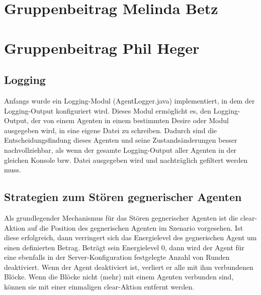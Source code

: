 \documentclass[runningheads]{llncs}
\begin{document}
\section{Gruppenbeitrag Melinda Betz}

\section{Gruppenbeitrag Phil Heger}

\subsection{Logging}
Anfangs wurde ein Logging-Modul (AgentLogger.java) implementiert, in dem der Logging-Output konfiguriert wird. Dieses Modul ermöglicht es, den Logging-Output, der von einem Agenten in einem bestimmten Desire oder Modul ausgegeben wird, in eine eigene Datei zu schreiben. Dadurch sind die Entscheidungsfindung dieses Agenten und seine Zustandsänderungen besser nachvollziehbar, als wenn der gesamte Logging-Output aller Agenten in der gleichen Konsole bzw. Datei ausgegeben wird und nachträglich gefiltert werden muss. 

\subsection{Strategien zum Stören gegnerischer Agenten}
Als grundlegender Mechanismus für das Stören gegnerischer Agenten ist die clear-Aktion auf die Position des gegnerischen Agenten im Szenario vorgesehen. Ist diese erfolgreich, dann verringert sich das Energielevel des gegnerischen Agent um einen definierten Betrag. Beträgt sein Energielevel 0, dann wird der Agent für eine ebenfalls in der Server-Konfiguration festgelegte Anzahl von Runden deaktiviert. Wenn der Agent deaktiviert ist, verliert er alle mit ihm verbundenen Blöcke. Wenn die Blöcke nicht (mehr) mit einem Agenten verbunden sind, können sie mit einer einmaligen clear-Aktion entfernt werden. 
\end{document}
